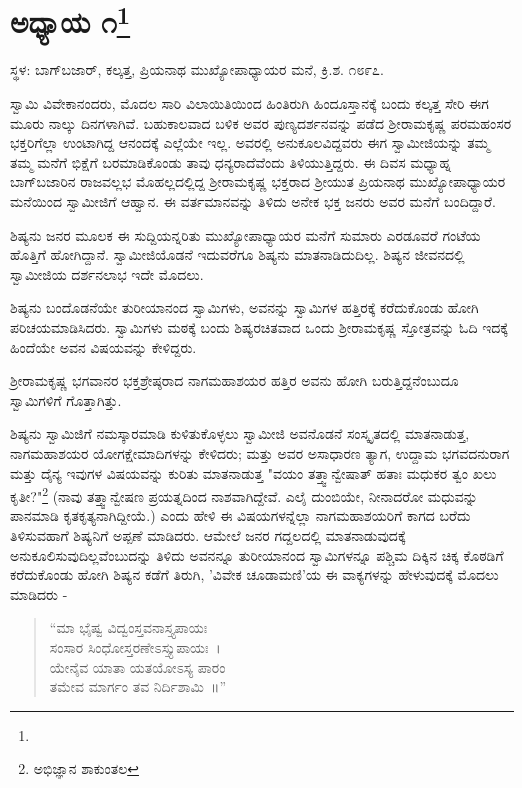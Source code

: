 
\chapter[ಅಧ್ಯಾಯ ೧]{ಅಧ್ಯಾಯ ೧\protect\footnote{}}

\centerline{{\fontsize{11}{13}\selectfont ಸ್ಥಳ: ಬಾಗ್‌ಬಜಾರ್, ಕಲ್ಕತ್ತ, ಪ್ರಿಯನಾಥ ಮುಖ್ಯೋಪಾಧ್ಯಾಯರ ಮನೆ, ಕ್ರಿ.ಶ. ೧೮೯೭.}}

ಸ್ವಾಮಿ ವಿವೇಕಾನಂದರು, ಮೊದಲ ಸಾರಿ ವಿಲಾಯಿತಿಯಿಂದ ಹಿಂತಿರುಗಿ ಹಿಂದೂಸ್ತಾನಕ್ಕೆ ಬಂದು ಕಲ್ಕತ್ತ ಸೇರಿ ಈಗ ಮೂರು ನಾಲ್ಕು ದಿನಗಳಾಗಿವೆ. ಬಹುಕಾಲವಾದ ಬಳಿಕ ಅವರ ಪುಣ್ಯದರ್ಶನವನ್ನು ಪಡೆದ ಶ‍್ರೀರಾಮಕೃಷ್ಣ ಪರಮಹಂಸರ ಭಕ್ತರಿಗೆಲ್ಲಾ ಉಂಟಾಗಿದ್ದ ಆನಂದಕ್ಕೆ ಎಲ್ಲೆಯೇ ಇಲ್ಲ. ಅವರಲ್ಲಿ ಅನುಕೂಲವಿದ್ದವರು ಈಗ ಸ್ವಾಮೀಜಿಯನ್ನು ತಮ್ಮ ತಮ್ಮ ಮನೆಗೆ ಭಿಕ್ಷೆಗೆ ಬರಮಾಡಿಕೊಂಡು ತಾವು ಧನ್ಯರಾದೆವೆಂದು ತಿಳಿಯುತ್ತಿದ್ದರು. ಈ ದಿವಸ ಮಧ್ಯಾಹ್ನ ಬಾಗ್‌ಬಜಾರಿನ ರಾಜವಲ್ಲಭ ಮೊಹಲ್ಲದಲ್ಲಿದ್ದ ಶ‍್ರೀರಾಮಕೃಷ್ಣ ಭಕ್ತರಾದ ಶ‍್ರೀಯುತ ಪ್ರಿಯನಾಥ ಮುಖ್ಯೋಪಾಧ್ಯಾಯರ ಮನೆಯಿಂದ ಸ್ವಾಮೀಜಿಗೆ ಆಹ್ವಾನ. ಈ ವರ್ತಮಾನವನ್ನು ತಿಳಿದು ಅನೇಕ ಭಕ್ತ ಜನರು ಅವರ ಮನೆಗೆ ಬಂದಿದ್ದಾರೆ.

ಶಿಷ್ಯನು ಜನರ ಮೂಲಕ ಈ ಸುದ್ದಿಯನ್ನರಿತು ಮುಖ್ಯೋಪಾಧ್ಯಾಯರ ಮನೆಗೆ ಸುಮಾರು ಎರಡೂವರೆ ಗಂಟೆಯ ಹೊತ್ತಿಗೆ ಹೋಗಿದ್ದಾನೆ. ಸ್ವಾಮೀಜಿಯೊಡನೆ ಇದುವರೆಗೂ ಶಿಷ್ಯನು ಮಾತನಾಡಿದುದಿಲ್ಲ. ಶಿಷ್ಯನ ಜೀವನದಲ್ಲಿ ಸ್ವಾಮೀಜಿಯ ದರ್ಶನಲಾಭ ಇದೇ ಮೊದಲು.

ಶಿಷ್ಯನು ಬಂದೊಡನೆಯೇ ತುರೀಯಾನಂದ ಸ್ವಾಮಿಗಳು, ಅವನನ್ನು ಸ್ವಾಮಿಗಳ ಹತ್ತಿರಕ್ಕೆ ಕರೆದುಕೊಂಡು ಹೋಗಿ ಪರಿಚಯಮಾಡಿಸಿದರು. ಸ್ವಾಮಿಗಳು ಮಠಕ್ಕೆ ಬಂದು ಶಿಷ್ಯರಚಿತವಾದ ಒಂದು ಶ‍್ರೀರಾಮಕೃಷ್ಣ ಸ್ತೋತ್ರವನ್ನು ಓದಿ ಇದಕ್ಕೆ ಹಿಂದೆಯೇ ಅವನ ವಿಷಯವನ್ನು ಕೇಳಿದ್ದರು.

ಶ‍್ರೀರಾಮಕೃಷ್ಣ ಭಗವಾನರ ಭಕ್ತಶ್ರೇಷ್ಠರಾದ ನಾಗಮಹಾಶಯರ ಹತ್ತಿರ ಅವನು ಹೋಗಿ ಬರುತ್ತಿದ್ದನೆಂಬುದೂ ಸ್ವಾಮಿಗಳಿಗೆ ಗೊತ್ತಾಗಿತ್ತು.

ಶಿಷ್ಯನು ಸ್ವಾಮಿಜಿಗೆ ನಮಸ್ಕಾರಮಾಡಿ ಕುಳಿತುಕೊಳ್ಳಲು ಸ್ವಾಮೀಜಿ ಅವನೊಡನೆ ಸಂಸ್ಕೃತದಲ್ಲಿ ಮಾತನಾಡುತ್ತ, ನಾಗಮಹಾಶಯರ ಯೋಗಕ್ಷೇಮಾದಿಗಳನ್ನು ಕೇಳಿದರು; ಮತ್ತು ಅವರ ಅಸಾಧಾರಣ ತ್ಯಾಗ, ಉದ್ದಾಮ ಭಗವದನುರಾಗ ಮತ್ತು ದೈನ್ಯ ಇವುಗಳ ವಿಷಯವನ್ನು ಕುರಿತು ಮಾತನಾಡುತ್ತ "ವಯಂ ತತ್ತ್ವಾನ್ವೇಷಾತ್ ಹತಾಃ ಮಧುಕರ ತ್ವಂ ಖಲು ಕೃತೀ?"\footnote{ಅಭಿಜ್ಞಾನ ಶಾಕುಂತಲ} (ನಾವು ತತ್ತ್ವಾನ್ವೇಷಣ ಪ್ರಯತ್ನದಿಂದ ನಾಶವಾಗಿದ್ದೇವೆ. ಎಲೈ ದುಂಬಿಯೇ, ನೀನಾದರೋ ಮಧುವನ್ನು ಪಾನಮಾಡಿ ಕೃತಕೃತ್ಯನಾಗಿದ್ದೀಯೆ.) ಎಂದು ಹೇಳಿ ಈ ವಿಷಯಗಳನ್ನೆಲ್ಲಾ ನಾಗಮಹಾಶಯರಿಗೆ ಕಾಗದ ಬರೆದು ತಿಳಿಸುವಹಾಗೆ ಶಿಷ್ಯನಿಗೆ ಅಪ್ಪಣೆ ಮಾಡಿದರು. ಆಮೇಲೆ ಜನರ ಗದ್ದಲದಲ್ಲಿ ಮಾತನಾಡುವುದಕ್ಕೆ ಅನುಕೂಲಿಸುವುದಿಲ್ಲವೆಂಬುದನ್ನು ತಿಳಿದು ಅವನನ್ನೂ ತುರೀಯಾನಂದ ಸ್ವಾಮಿಗಳನ್ನೂ ಪಶ್ಚಿಮ ದಿಕ್ಕಿನ ಚಿಕ್ಕ ಕೊಠಡಿಗೆ ಕರೆದುಕೊಂಡು ಹೋಗಿ ಶಿಷ್ಯನ ಕಡೆಗೆ ತಿರುಗಿ, 'ವಿವೇಕ ಚೂಡಾಮಣಿ'ಯ ಈ ವಾಕ್ಯಗಳನ್ನು ಹೇಳುವುದಕ್ಕೆ ಮೊದಲು ಮಾಡಿದರು -

\begin{verse}
“ಮಾ ಭೈಷ್ವ ವಿದ್ವಂಸ್ತವನಾಸ್ತ್ಯಪಾಯಃ\\ಸಂಸಾರ ಸಿಂಧೋಸ್ತರಣೇಽಸ್ತ್ಯುಪಾಯಃ~।\\ಯೇನೈವ ಯಾತಾ ಯತಯೋಽಸ್ಯ ಪಾರಂ\\ತಮೇವ ಮಾರ್ಗಂ ತವ ನಿರ್ದಿಶಾಮಿ~॥”
\end{verse}

